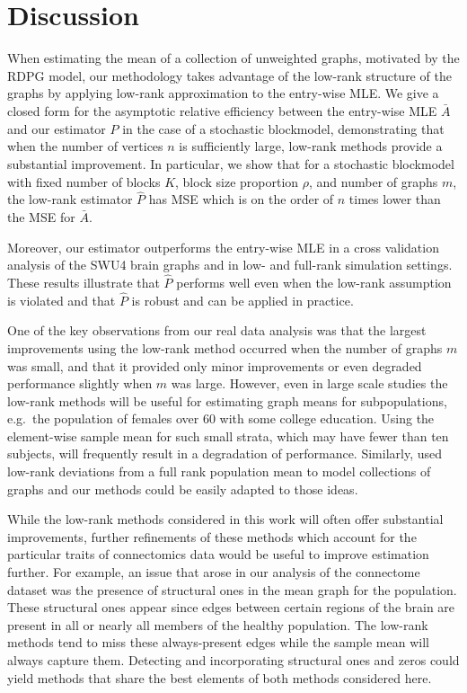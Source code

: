 
\chapter{Discussion}
\label{chap:discussion}

When estimating the mean of a collection of unweighted graphs, motivated by the RDPG model, our methodology takes advantage of the low-rank structure of the graphs by applying low-rank approximation to the entry-wise MLE. 
We give a closed form for the asymptotic relative efficiency between the entry-wise MLE $\bar{A}$ and our estimator $\hat{P}$ in the case of a stochastic blockmodel, demonstrating that when the number of vertices $n$ is sufficiently large, low-rank methods provide a substantial improvement.
In particular, we show that for a stochastic blockmodel with fixed number of blocks $K$, block size proportion $\rho$, and number of graphs $m$, the low-rank estimator $\hat{P}$ has MSE which is on the order of $n$ times lower than the MSE for $\bar{A}$.

Moreover, our estimator outperforms the entry-wise MLE in a cross validation analysis of the SWU4 brain graphs and in low- and full-rank simulation settings.
These results illustrate that $\hat{P}$ performs well even when the low-rank assumption is violated and that $\hat{P}$ is robust and can be applied in practice.

One of the key observations from our real data analysis was that the largest improvements using the low-rank method occurred when the number of graphs $m$ was small, and that it provided only minor improvements or even degraded performance slightly when $m$ was large. 
However, even in large scale studies the low-rank methods will be useful for estimating graph means for subpopulations, e.g.\ the population of females over 60 with some college education.
Using the element-wise sample mean for such small strata, which may have fewer than ten subjects, will frequently result in a degradation of performance.
Similarly, \citet{durante2014nonparametric} used low-rank deviations from a full rank population mean to model collections of graphs and our methods could be easily adapted to those ideas.

While the low-rank methods considered in this work will often offer substantial improvements, further refinements of these methods which account for the particular traits of connectomics data would be useful to improve estimation further.
For example, an issue that arose in our analysis of the connectome dataset was the presence of structural ones in the mean graph for the population. 
These structural ones appear since edges between certain regions of the brain are present in all or nearly all members of the healthy population. 
The low-rank methods tend to miss these always-present edges while the sample mean will always capture them.
Detecting and incorporating structural ones and zeros could yield methods that share the best elements of both methods considered here.

